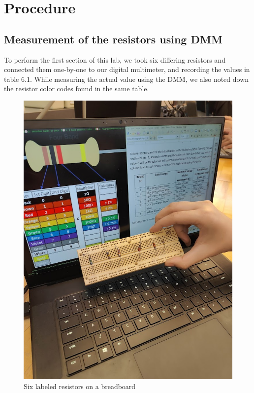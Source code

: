 \documentclass[titlepage]{article}
\begin{document}
	\section{Procedure}
        \subsection{Measurement of the resistors using DMM}
        To perform the first section of this lab, we took six differing resistors and connected them one-by-one to our digital multimeter, and recording the values in table 6.1. While measuring the actual value using the DMM, we also noted down the resistor color codes found in the same table.

        \FloatBarrier
        \begin{figure}[hbt!]
                \centering
                \caption{Six labeled resistors on a breadboard}
                \includegraphics[scale=0.2]{procedure/unknownresistors}
            \end{figure} 
            \FloatBarrier
\end{document}
